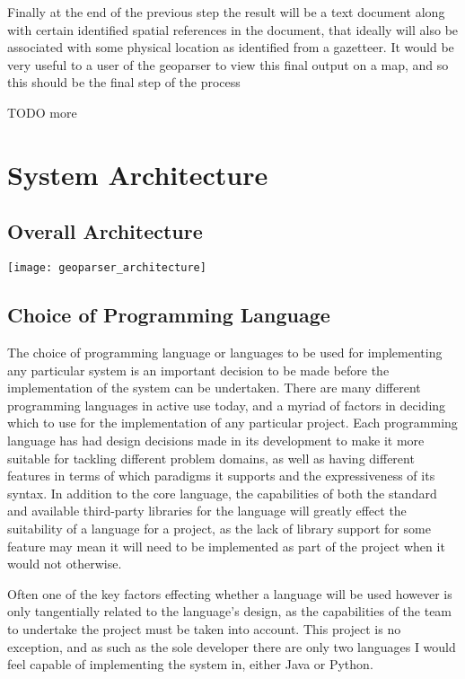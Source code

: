 \documentclass[12pt, a4paper]{report}
\begin{document}
Finally at the end of the previous step the result will be a text document along with certain identified spatial references in the document, that ideally will also be associated with some physical location as identified from a gazetteer. It would be very useful to a user of the geoparser to view this final output on a map, and so this should be the final step of the process

TODO more

\section{System Architecture}

\subsection{Overall Architecture}

\texttt{[image: geoparser\_architecture]}

\subsection{Choice of Programming Language}

The choice of programming language or languages to be used for implementing any particular system is an important decision to be made before the implementation of the system can be undertaken. There are many different programming languages in active use today, and a myriad of factors in deciding which to use for the implementation of any particular project. Each programming language has had design decisions made in its development to make it more suitable for tackling different problem domains, as well as having different features in terms of which paradigms it supports and the expressiveness of its syntax. In addition to the core language, the capabilities of both the standard and available third-party libraries for the language will greatly effect the suitability of a language for a project, as the lack of library support for some feature may mean it will need to be implemented as part of the project when it would not otherwise.

Often one of the key factors effecting whether a language will be used however is only tangentially related to the language's design, as the capabilities of the team to undertake the project must be taken into account. This project is no exception, and as such as the sole developer there are only two languages I would feel capable of implementing the system in, either Java or Python.
\end{document}

